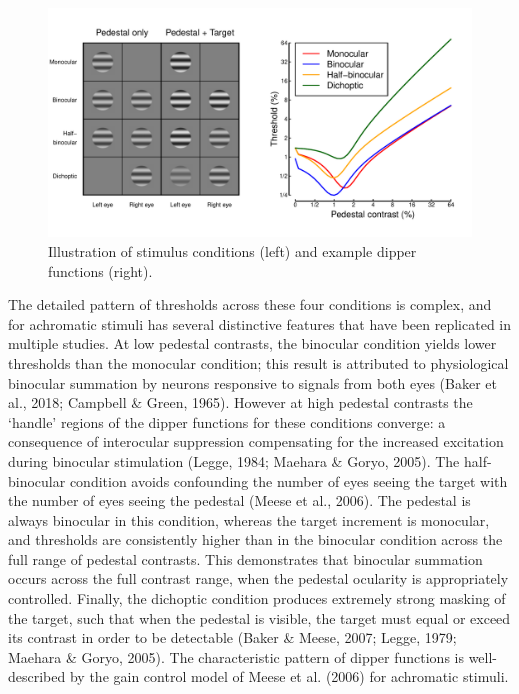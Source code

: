 \documentclass[
  letterpaper,
  DIV=11,
  numbers=noendperiod]{scrartcl}
\begin{document}
\begin{figure}

{\centering \includegraphics{Figures/exampledips.pdf}

}

\caption{\label{fig-exampledips}Illustration of stimulus conditions
(left) and example dipper functions (right).}

\end{figure}

The detailed pattern of thresholds across these four conditions is
complex, and for achromatic stimuli has several distinctive features
that have been replicated in multiple studies. At low pedestal
contrasts, the binocular condition yields lower thresholds than the
monocular condition; this result is attributed to physiological
binocular summation by neurons responsive to signals from both eyes
(Baker et al., 2018; Campbell \& Green, 1965). However at high pedestal
contrasts the `handle' regions of the dipper functions for these
conditions converge: a consequence of interocular suppression
compensating for the increased excitation during binocular stimulation
(Legge, 1984; Maehara \& Goryo, 2005). The half-binocular condition
avoids confounding the number of eyes seeing the target with the number
of eyes seeing the pedestal (Meese et al., 2006). The pedestal is always
binocular in this condition, whereas the target increment is monocular,
and thresholds are consistently higher than in the binocular condition
across the full range of pedestal contrasts. This demonstrates that
binocular summation occurs across the full contrast range, when the
pedestal ocularity is appropriately controlled. Finally, the dichoptic
condition produces extremely strong masking of the target, such that
when the pedestal is visible, the target must equal or exceed its
contrast in order to be detectable (Baker \& Meese, 2007; Legge, 1979;
Maehara \& Goryo, 2005). The characteristic pattern of dipper functions
is well-described by the gain control model of Meese et al. (2006) for
achromatic stimuli.
\end{document}

